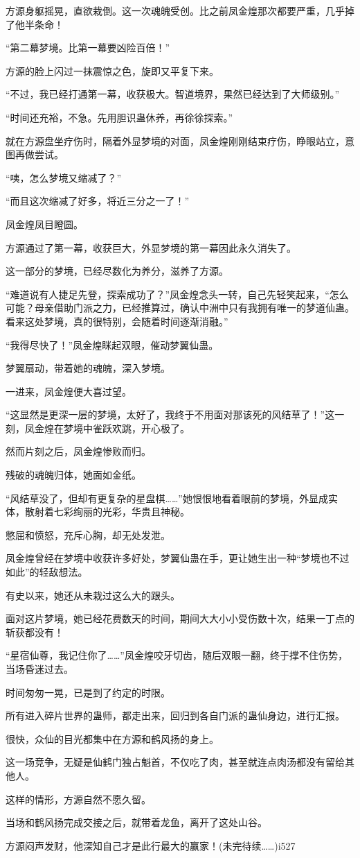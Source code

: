 \begin{this_body}
方源身躯摇晃，直欲栽倒。这一次魂魄受创。比之前凤金煌那次都要严重，几乎掉了他半条命！

“第二幕梦境。比第一幕要凶险百倍！”

方源的脸上闪过一抹震惊之色，旋即又平复下来。

“不过，我已经打通第一幕，收获极大。智道境界，果然已经达到了大师级别。”

“时间还充裕，不急。先用胆识蛊休养，再徐徐探索。”

就在方源盘坐疗伤时，隔着外显梦境的对面，凤金煌刚刚结束疗伤，睁眼站立，意图再做尝试。

“咦，怎么梦境又缩减了？”

“而且这次缩减了好多，将近三分之一了！”

凤金煌凤目瞪圆。

方源通过了第一幕，收获巨大，外显梦境的第一幕因此永久消失了。

这一部分的梦境，已经尽数化为养分，滋养了方源。

“难道说有人捷足先登，探索成功了？”凤金煌念头一转，自己先轻笑起来，“怎么可能？母亲借助门派之力，已经推算过，确认中洲中只有我拥有唯一的梦道仙蛊。看来这处梦境，真的很特别，会随着时间逐渐消融。”

“我得尽快了！”凤金煌眯起双眼，催动梦翼仙蛊。

梦翼扇动，带着她的魂魄，深入梦境。

一进来，凤金煌便大喜过望。

“这显然是更深一层的梦境，太好了，我终于不用面对那该死的风结草了！”这一刻，凤金煌在梦境中雀跃欢跳，开心极了。

然而片刻之后，凤金煌惨败而归。

残破的魂魄归体，她面如金纸。

“风结草没了，但却有更复杂的星盘棋……”她恨恨地看着眼前的梦境，外显成实体，散射着七彩绚丽的光彩，华贵且神秘。

憋屈和愤怒，充斥心胸，却无处发泄。

凤金煌曾经在梦境中收获许多好处，梦翼仙蛊在手，更让她生出一种“梦境也不过如此”的轻敌想法。

有史以来，她还从未栽过这么大的跟头。

面对这片梦境，她已经花费数天的时间，期间大大小小受伤数十次，结果一丁点的斩获都没有！

“星宿仙尊，我记住你了……”凤金煌咬牙切齿，随后双眼一翻，终于撑不住伤势，当场昏迷过去。

时间匆匆一晃，已是到了约定的时限。

所有进入碎片世界的蛊师，都走出来，回归到各自门派的蛊仙身边，进行汇报。

很快，众仙的目光都集中在方源和鹤风扬的身上。

这一场竞争，无疑是仙鹤门独占魁首，不仅吃了肉，甚至就连点肉汤都没有留给其他人。

这样的情形，方源自然不愿久留。

当场和鹤风扬完成交接之后，就带着龙鱼，离开了这处山谷。

方源闷声发财，他深知自己才是此行最大的赢家！(未完待续……)i527

\end{this_body}

